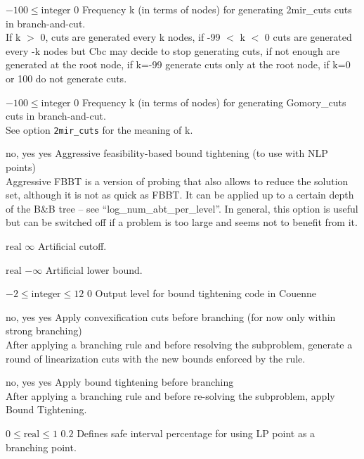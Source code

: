 %
{$-100\leq\textrm{integer}$}%
{$0$}%
{Frequency k (in terms of nodes) for generating 2mir\_cuts cuts in branch-and-cut.\\
If k $>$ 0, cuts are generated every k nodes, if -99 $<$ k $<$ 0 cuts are generated every -k nodes but Cbc may decide to stop generating cuts, if not enough are generated at the root node, if k=-99 generate cuts only at the root node, if k=0 or 100 do not generate cuts.}%
{}

%
{$-100\leq\textrm{integer}$}%
{$0$}%
{Frequency k (in terms of nodes) for generating Gomory\_cuts cuts in branch-and-cut.\\
See option \texttt{2mir\_cuts} for the meaning of k.}%
{}

%
{\ttfamily no, yes}%
{yes}%
{Aggressive feasibility-based bound tightening (to use with NLP points)\\
Aggressive FBBT is a version of probing that also allows to reduce the solution set, although it is not as quick as FBBT. It can be applied up to a certain depth of the B\&B tree -- see ``log\_num\_abt\_per\_level''. In general, this option is useful but can be switched off if a problem is too large and seems not to benefit from it.}%
{}

%
{$\textrm{real}$}%
{$\infty$}%
{Artificial cutoff.}%
{}

%
{$\textrm{real}$}%
{$-\infty$}%
{Artificial lower bound.}%
{}

%
{$-2\leq\textrm{integer}\leq12$}%
{$0$}%
{Output level for bound tightening code in Couenne}%
{}

%
{\ttfamily no, yes}%
{yes}%
{Apply convexification cuts before branching (for now only within strong branching)\\
After applying a branching rule and before resolving the subproblem, generate a round of linearization cuts with the new bounds enforced by the rule.}%
{}

%
{\ttfamily no, yes}%
{yes}%
{Apply bound tightening before branching\\
After applying a branching rule and before re-solving the subproblem, apply Bound Tightening.}%
{}

%
{$0\leq\textrm{real}\leq1$}%
{$0.2$}%
{Defines safe interval percentage for using LP point as a branching point.}%
{}

